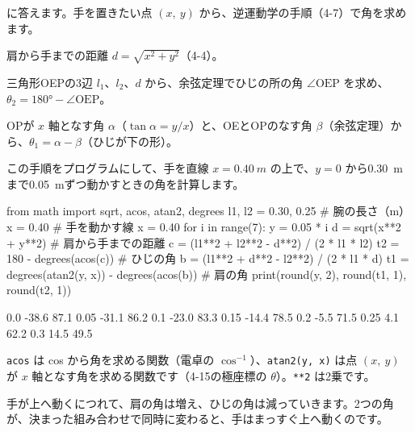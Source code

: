 \leavevmode\bkhatenaref に答えます。手を置きたい点 $(x,\ y)$ から、逆運動学の手順（4-7）で角を求めます。
\begin{enumerate}[label={\bkcircled[bkBlue]{\arabic*}}, leftmargin=2.4\zw, itemsep=1pt, topsep=2pt]
\item 肩から手までの距離 $d=\sqrt{x^2+y^2}$（4-4）。
\item 三角形OEPの3辺 $l_1$、$l_2$、$d$ から、余弦定理でひじの所の角 $\angle\mathrm{OEP}$ を求め、$\theta_2=\ang{180}-\angle\mathrm{OEP}$。
\item OPが $x$ 軸となす角 $\alpha$（$\tan\alpha=y/x$）と、OEとOPのなす角 $\beta$（余弦定理）から、$\theta_1=\alpha-\beta$（ひじが下の形）。
\end{enumerate}
この手順をプログラムにして、手を直線 $x=\qty{0.40}{m}$ の上で、$y=0$ から\qty{0.30}{m}まで\qty{0.05}{m}ずつ動かすときの角を計算します。
\begin{phcode}
from math import sqrt, acos, atan2, degrees
l1, l2 = 0.30, 0.25  \# 腕の長さ（m）
x = 0.40  \# 手を動かす線 x = 0.40
for i in range(7):
    y = 0.05 * i
    d = sqrt(x**2 + y**2)  \# 肩から手までの距離
    c = (l1**2 + l2**2 - d**2) / (2 * l1 * l2)
    t2 = 180 - degrees(acos(c))  \# ひじの角
    b = (l1**2 + d**2 - l2**2) / (2 * l1 * d)
    t1 = degrees(atan2(y, x)) - degrees(acos(b))  \# 肩の角
    print(round(y, 2), round(t1, 1), round(t2, 1))
\end{phcode}
\begin{phcodeout}
0.0 -38.6 87.1
0.05 -31.1 86.2
0.1 -23.0 83.3
0.15 -14.4 78.5
0.2 -5.5 71.5
0.25 4.1 62.2
0.3 14.5 49.5
\end{phcodeout}
\noindent\begin{minipage}[c]{0.5\linewidth}
\texttt{acos} は cos から角を求める関数（電卓の $\cos^{-1}$）、\texttt{atan2(y, x)} は点 $(x,\ y)$ が $x$ 軸となす角を求める関数です（4-15の極座標の $\theta$）。\texttt{**2} は2乗です。\par\vspace{3pt}
手が上へ動くにつれて、肩の角は増え、ひじの角は減っていきます。2つの角が、決まった組み合わせで同時に変わると、手はまっすぐ上へ動くのです。
\end{minipage}\hfill
\begin{minipage}[c]{0.46\linewidth}\centering
{}
\end{minipage}

